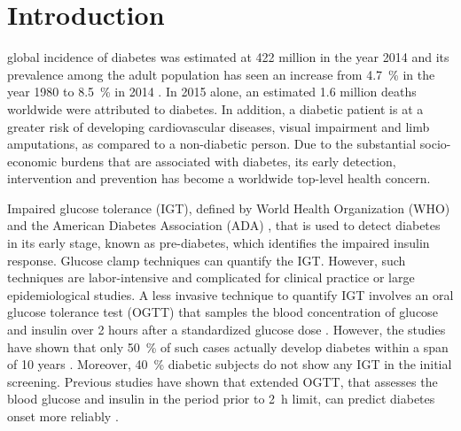 \documentclass[journal,comsoc]{IEEEtran}
\begin{document}
\section{Introduction}
%
%
%
%
 global incidence of diabetes was estimated at \num{422} million in the year \num{2014} and its prevalence among the adult population has seen an increase from \SI{4.7}{\percent} in the year \num{1980} to \SI{8.5}{\percent} in \num{2014} \cite{mathers_projections_2006}. In \num{2015} alone, an estimated \num{1.6} million deaths worldwide were attributed to diabetes. In addition, a diabetic patient is at a greater risk of developing cardiovascular diseases, visual impairment and limb amputations, as compared to a non-diabetic person. Due to the substantial socio-economic burdens that are associated with diabetes, its early detection, intervention and prevention has become a worldwide top-level health concern.


Impaired glucose tolerance (IGT), defined by World Health Organization (WHO) \cite{organization_definition_2006} and the American Diabetes Association (ADA) \cite{american_diabetes_association_diagnosis_2005}, that is used to detect diabetes in its early stage, known as pre-diabetes, which identifies the impaired insulin response. Glucose clamp techniques can quantify the IGT. However, such techniques are labor-intensive and complicated for clinical practice or large epidemiological studies. A less invasive technique to quantify IGT involves an oral glucose tolerance test (OGTT) that samples the blood concentration of glucose and insulin over 2 hours after a standardized glucose dose  \cite{tschritter_assessing_2003}. However, the studies have shown that only \SI{50}{\percent} of such cases actually develop diabetes within a span of \num{10} years \cite{shaw_impaired_1999, writing_committee_impaired_2002}. Moreover, \SI{40}{\percent} diabetic subjects do not show any IGT in the initial screening. Previous studies have shown that extended OGTT, that assesses the blood glucose and insulin in the period prior to \SI{2}{\hour} limit, can predict diabetes onset more reliably \cite{abdul-ghani_what_2007}.
\end{document}
